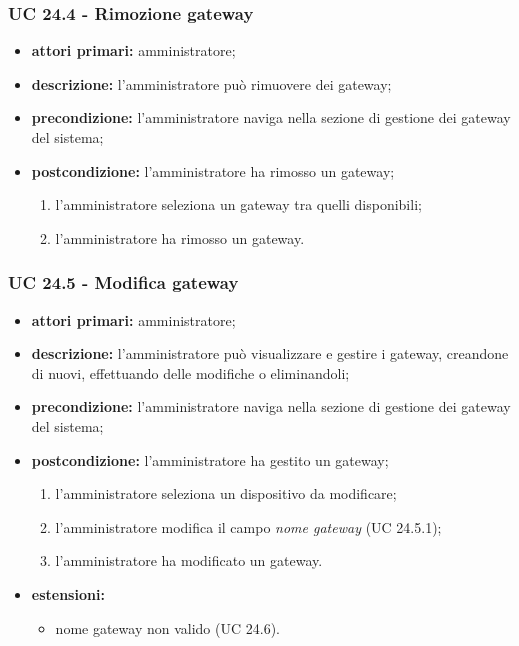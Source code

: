 			\subsubsection{UC 24.4 - Rimozione gateway}
			\begin{itemize}
				\item \textbf{attori primari:} amministratore;
				\item \textbf{descrizione:} l'amministratore può rimuovere dei gateway;
				\item \textbf{precondizione:} l'amministratore naviga nella sezione di gestione dei gateway del sistema;
				\item \textbf{postcondizione:} l'amministratore ha rimosso un gateway;
				\begin{enumerate}
					\item{l'amministratore seleziona un gateway tra quelli disponibili;}
					\item{l'amministratore ha rimosso un gateway.}
				\end{enumerate} 
			\end{itemize}

			\subsubsection{UC 24.5 - Modifica gateway}
			\begin{itemize}
				\item \textbf{attori primari:} amministratore;
				\item \textbf{descrizione:} l'amministratore può visualizzare e gestire i gateway, creandone di nuovi, effettuando delle modifiche o eliminandoli;
				\item \textbf{precondizione:} l'amministratore naviga nella sezione di gestione dei gateway del sistema;
				\item \textbf{postcondizione:} l'amministratore ha gestito un gateway;
				\begin{enumerate}
					\item{l'amministratore seleziona un dispositivo da modificare;}
					\item{l'amministratore modifica il campo \textit{nome gateway} (UC 24.5.1);}
					\item{l'amministratore ha modificato un gateway.}
				\end{enumerate} 
				\item \textbf{estensioni:}
				\begin{itemize}
					\item nome gateway non valido (UC 24.6).
				\end{itemize}
			\end{itemize}

